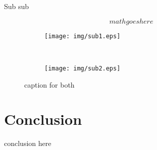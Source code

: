 \documentclass[12pt,journal,a4paper,onecolumn]{IEEEtran}
\begin{document}
Sub sub

\begin{equation}\label{eq:res_bitrate}
    math goes here
\end{equation}

\begin{figure}
    \centering
	\begin{subfigure}[htb]{0.42\textwidth}
        \texttt{[image: img/sub1.eps]}
        \caption{}
        \label{fig:}
    \end{subfigure}
    ~
    \begin{subfigure}[htb]{0.42\textwidth}
        \texttt{[image: img/sub2.eps]}
        \caption{}
        \label{fig:}
    \end{subfigure}
    \caption{caption for both}
    \label{fig:label_for_both}
\end{figure}

\section{Conclusion}
conclusion here



\end{document}
